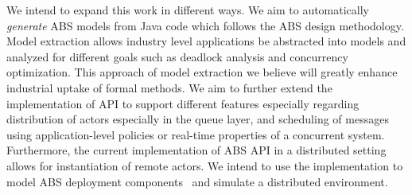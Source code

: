 We intend to expand this work in different ways.
We aim to automatically \emph{generate} ABS models from Java code which follows the ABS
design methodology.
Model extraction allows industry level applications be abstracted into models and 
analyzed for different goals such as deadlock analysis and concurrency optimization.
This approach of model extraction we believe will greatly enhance industrial uptake of formal methods.
We aim to further extend the implementation of API to support different features especially regarding distribution of actors especially in the queue layer, and scheduling of messages using application-level policies or real-time properties of a concurrent system.
Furthermore, the current implementation of ABS API in a distributed setting allows for instantiation of remote actors. 
We intend to use the implementation to model ABS deployment components~\cite{johnsen2012modeling} and simulate a distributed environment.

% 
% 
